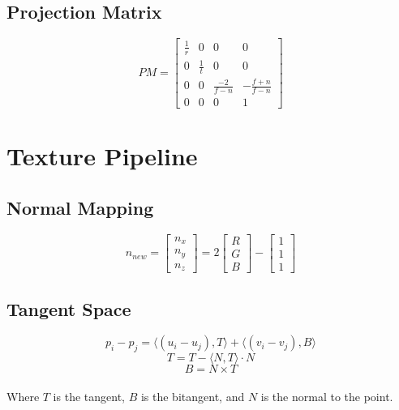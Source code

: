 \documentclass{article}
\begin{document}
\subsection{Projection Matrix}
\vspace{.3cm}
\[ PM = \begin{bmatrix} \frac{1}{r} & 0 & 0 & 0 \\ 0 & \frac{1}{t} & 0 & 0 \\ 0 & 0 & \frac{-2}{f-n} & -\frac{f+n}{f-n} \\ 0 & 0 & 0 & 1 \end{bmatrix} \]

\section{Texture Pipeline}
\subsection{Normal Mapping}
\vspace{.3cm}
\[ n_{new} = \begin{bmatrix} n_x \\ n_y \\ n_z \end{bmatrix} = 2 \begin{bmatrix} R \\ G \\ B \end{bmatrix} - \begin{bmatrix} 1 \\ 1 \\ 1 \end{bmatrix} \]

\subsection{Tangent Space}
\vspace{.3cm}
\[ p_i - p_j = \langle (u_i - u_j), T \rangle + \langle (v_i - v_j), B \rangle \]
\[ T = T - \langle N, T \rangle \cdot N \]
\[ B = N \times T \] \\
Where $T$ is the tangent, $B$ is the bitangent, and $N$ is the normal to the point.
\end{document}
